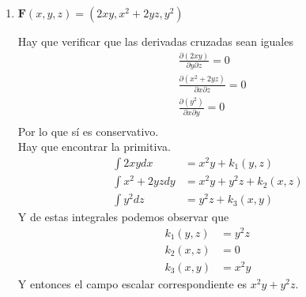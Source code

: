 \documentclass{article}
\begin{document}
\begin{enumerate}
{\begin{enumerate}
{			\color{azul}
            Primero, hay que verificar que las derivadas cruzadas sean iguales.
            \begin{align*}
                \frac{\partial}{\partial y}(2x\cos y-y\cos x)=-2x\sin y -\cos x\\
                \frac{\partial}{\partial x}(-x^2\sin y -\sin x)=-2x\sin y -\cos x
            \end{align*}
            Por lo que $\mathbf{F}$ sí es un campo vectorial conservativo.\\
            Ahora hay que encontrar su primitiva.
            \begin{align*}
                \int{2x\cos y-y\cos x dx} &= x^2\cos y - y\sin x + k(y)\\
                \int{ -x^2\sin y -\sin x dy} &= x^2\cos y - y\sin x + k(x)
            \end{align*}
            Entonces, $k(y) = k(x) = 0$.\\
            Por lo que el campo escalar es $x^2\cos y - y\sin x$.
            }

            \item{
            	$\mathbf{F} (x,y,z) = (2xy, x^2 + 2yz, y^2)$

           \color{azul}
            Hay que verificar que las derivadas cruzadas sean iguales
            \begin{align*}
                &\frac{\partial(2xy)}{\partial y \partial z} = 0 \\
                &\frac{\partial(x^2 + 2yz)}{\partial x \partial z} = 0 \\
                &\frac{\partial(y^2)}{\partial x \partial y} = 0 \\
            \end{align*}
            Por lo que sí es conservativo.\\
            Hay que encontrar la primitiva.
            \begin{align*}
                \int{2xy dx} &= x^2y + k_1(y, z)\\
                \int{x^2 + 2yz dy} &= x^2y + y^2z + k_2(x, z)\\
                \int{y^2 dz} &= y^2z + k_3(x, y)
            \end{align*}
            Y de estas integrales podemos observar que
            \begin{align*}
                k_1(y, z) &= y^2z \\
                k_2(x, z) &= 0 \\
                k_3(x, y) &= x^2y
            \end{align*}
            Y entonces el campo escalar correspondiente es $x^2y + y^2z$.
            }
            \end{enumerate}
        }


\end{enumerate}
\end{document}
